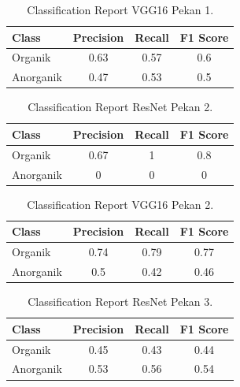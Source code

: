 \documentclass[12pt,a4paper]{article}
\begin{document}
\begin{table}[H]
\centering
\begin{tabular}{|l|c|c|c|}
    \hline
    \textbf{Class} & \textbf{Precision} & \textbf{Recall} & \textbf{F1 Score} \\
    \hline
    Organik & 0.63 & 0.57 & 0.6 \\
    Anorganik & 0.47 & 0.53 & 0.5 \\
    \hline
\end{tabular}
\caption{Classification Report VGG16 Pekan 1.}
\label{tab:vgg16_week1}
\end{table}

\begin{table}[H]
\centering
\begin{tabular}{|l|c|c|c|}
    \hline
    \textbf{Class} & \textbf{Precision} & \textbf{Recall} & \textbf{F1 Score} \\
    \hline
    Organik & 0.67 & 1 & 0.8 \\
    Anorganik & 0 & 0 & 0 \\
    \hline
\end{tabular}
\caption{Classification Report ResNet Pekan 2.}
\label{tab:resnet_week2}
\end{table}

\begin{table}[H]
\centering
\begin{tabular}{|l|c|c|c|}
    \hline
    \textbf{Class} & \textbf{Precision} & \textbf{Recall} & \textbf{F1 Score} \\
    \hline
    Organik & 0.74 & 0.79 & 0.77 \\
    Anorganik & 0.5 & 0.42 & 0.46 \\
    \hline
\end{tabular}
\caption{Classification Report VGG16 Pekan 2.}
\label{tab:vgg16_week2}
\end{table}

\begin{table}[H]
\centering
\begin{tabular}{|l|c|c|c|}
    \hline
    \textbf{Class} & \textbf{Precision} & \textbf{Recall} & \textbf{F1 Score} \\
    \hline
    Organik & 0.45 & 0.43 & 0.44 \\
    Anorganik & 0.53 & 0.56 & 0.54 \\
    \hline
\end{tabular}
\caption{Classification Report ResNet Pekan 3.}
\label{tab:resnet_week3}
\end{table}
\end{document}
